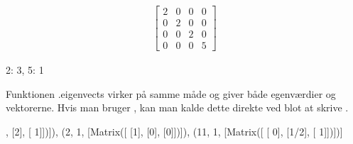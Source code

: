 \documentclass[letterpaper,10pt,english]{jupyterBook}
\begin{document}
\begin{sphinxVerbatim}[commandchars=\\\{\}]
   
  \PYG{p}{[}\PYG{p}{[}   \PYG{p}{]} \PYG{p}{[}   \PYG{p}{]} \PYG{p}{[}   \PYG{p}{]} \PYG{p}{[}   \PYG{p}{]}\PYG{p}{]}
\end{sphinxVerbatim}
\begin{equation*}
\begin{split}\displaystyle \left[\begin{matrix}2 & 0 & 0 & 0\\0 & 2 & 0 & 0\\0 & 0 & 2 & 0\\0 & 0 & 0 & 5\end{matrix}\right]\end{split}
\end{equation*}
\begin{sphinxVerbatim}[commandchars=\\\{\}]
\end{sphinxVerbatim}

\begin{sphinxVerbatim}[commandchars=\\\{\}]
\PYGZob{}2: 3, 5: 1\PYGZcb{}
\end{sphinxVerbatim}

Funktionen .eigenvects virker på samme måde og giver både egenværdier og \sphinxhyphen{}vektorerne. Hvis man bruger , kan man kalde dette direkte ved blot at skrive .

\begin{sphinxVerbatim}[commandchars=\\\{\}]
\end{sphinxVerbatim}

\begin{sphinxVerbatim}[commandchars=\\\{\}]
[(1,
  1,
  [Matrix([
   [ 0],
   [\PYGZhy{}2],
   [ 1]])]),
 (2,
  1,
  [Matrix([
   [1],
   [0],
   [0]])]),
 (11,
  1,
  [Matrix([
   [  0],
   [1/2],
   [  1]])])]
\end{sphinxVerbatim}
\end{document}
